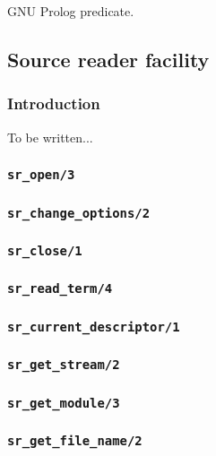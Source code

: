 \Portability

GNU Prolog predicate.

\subsection{Source reader facility}

\subsubsection{Introduction}

To be written...

\subsubsection{\texttt{sr\_open/3}}

\subsubsection{\texttt{sr\_change\_options/2}}

\subsubsection{\texttt{sr\_close/1}}

\subsubsection{\texttt{sr\_read\_term/4}}

\subsubsection{\texttt{sr\_current\_descriptor/1}}

\subsubsection{\texttt{sr\_get\_stream/2}}

\subsubsection{\texttt{sr\_get\_module/3}}

\subsubsection{\texttt{sr\_get\_file\_name/2}}

